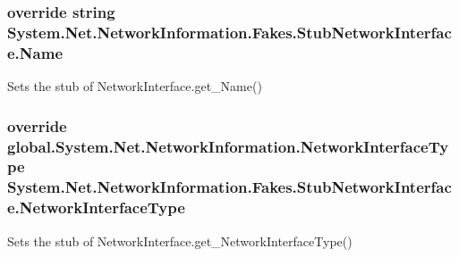 \hypertarget{class_system_1_1_net_1_1_network_information_1_1_fakes_1_1_stub_network_interface_af9e526c76d0e512ee8a884203292f4c7}{
\subsubsection[{Name}]{\setlength{\rightskip}{0pt plus 5cm}override string System.\-Net.\-Network\-Information.\-Fakes.\-Stub\-Network\-Interface.\-Name\hspace{0.3cm}{\ttfamily [get]}}}\label{class_system_1_1_net_1_1_network_information_1_1_fakes_1_1_stub_network_interface_af9e526c76d0e512ee8a884203292f4c7}


Sets the stub of Network\-Interface.\-get\-\_\-\-Name()

\hypertarget{class_system_1_1_net_1_1_network_information_1_1_fakes_1_1_stub_network_interface_a33dc15b59688aec83c2b9c917b22c788}{
\subsubsection[{Network\-Interface\-Type}]{\setlength{\rightskip}{0pt plus 5cm}override global.\-System.\-Net.\-Network\-Information.\-Network\-Interface\-Type System.\-Net.\-Network\-Information.\-Fakes.\-Stub\-Network\-Interface.\-Network\-Interface\-Type\hspace{0.3cm}{\ttfamily [get]}}}\label{class_system_1_1_net_1_1_network_information_1_1_fakes_1_1_stub_network_interface_a33dc15b59688aec83c2b9c917b22c788}


Sets the stub of Network\-Interface.\-get\-\_\-\-Network\-Interface\-Type()

